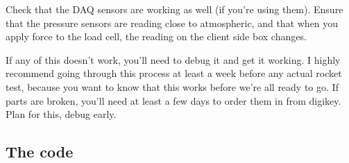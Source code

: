 \documentclass[11pt]{article}
\begin{document}
Check that the DAQ sensors are working as well (if you're using them). Ensure
that the pressure sensors are reading close to atmospheric, and that when you
apply force to the load cell, the reading on the client side box changes.

If any of this doesn't work, you'll need to debug it and get it working. I
highly recommend going through this process at least a week before any actual
rocket test, because you want to know that this works before we're all ready to
go. If parts are broken, you'll need at least a few days to order them in from
digikey. Plan for this, debug early.

\subsection{The code}
\label{sec:org66fd929}
\end{document}
